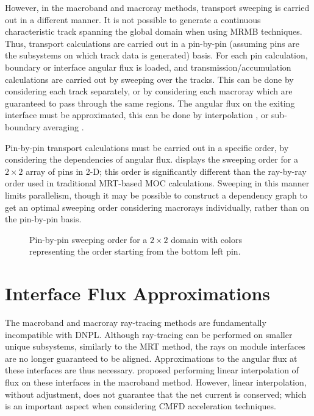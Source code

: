 {{        However, in the macroband and macroray methods, transport sweeping is carried out in a different manner.
        It is not possible to generate a continuous characteristic track spanning the global domain when using \ac{MRMB} techniques.
        Thus, transport calculations are carried out in a pin-by-pin (assuming pins are the subsystems on which track data is generated) basis.
        For each pin calculation, boundary or interface angular flux is loaded, and transmission/accumulation calculations are carried out by sweeping over the tracks.
        This can be done by considering each track separately, or by considering each macroray which are guaranteed to pass through the same regions.
        The angular flux on the exiting interface must be approximated, this can be done by interpolation \cite{Yamamoto2005}, or sub-boundary averaging \cite{Liu2014}.

        Pin-by-pin transport calculations must be carried out in a specific order, by considering the dependencies of angular flux.
         displays the sweeping order for a $2\times2$ array of pins in 2-D; this order is significantly different than the ray-by-ray order used in traditional \ac{MRT}-based \ac{MOC} calculations.
        Sweeping in this manner limits parallelism, though it may be possible to construct a dependency graph to get an optimal sweeping order considering macrorays individually, rather than on the pin-by-pin basis.

        \begin{figure}[h]
            \centering
            \def\svgwidth{0.65\linewidth}
            
            \caption{Pin-by-pin sweeping order for a $2\times2$ domain with colors representing the order starting from the bottom left pin.}
            \label{fig:RT:Macroband Sweep Order}
        \end{figure}
    }
    \section{Interface Flux Approximations}{\label{sec:RT:Interface Flux Approximations}
      The macroband and macroray ray-tracing methods are fundamentally incompatible with \acf{DNPL}.
      Although ray-tracing can be performed on smaller unique subsystems, similarly to the \ac{MRT} method, the rays on module interfaces are no longer guaranteed to be aligned.
      Approximations to the angular flux at these interfaces are thus necessary.
      \citet{Yamamoto2005} proposed performing linear interpolation of flux on these interfaces in the macroband method.
      However, linear interpolation, without adjustment, does not guarantee that the net current is conserved; which is an important aspect when considering \ac{CMFD} acceleration techniques.

}}
